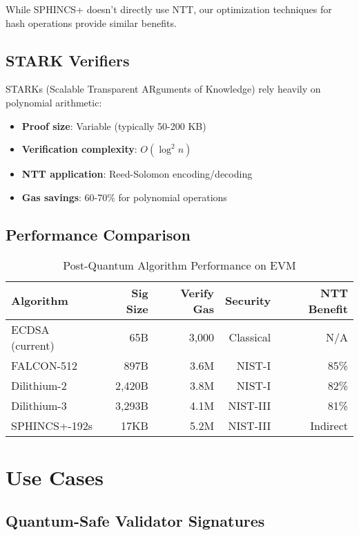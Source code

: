 \documentclass[11pt,a4paper]{article}
\begin{document}
While SPHINCS+ doesn't directly use NTT, our optimization techniques for hash operations provide similar benefits.

\subsection{STARK Verifiers}

STARKs (Scalable Transparent ARguments of Knowledge) rely heavily on polynomial arithmetic:

\begin{itemize}
\item \textbf{Proof size}: Variable (typically 50-200 KB)
\item \textbf{Verification complexity}: $O(\log^2 n)$
\item \textbf{NTT application}: Reed-Solomon encoding/decoding
\item \textbf{Gas savings}: 60-70\% for polynomial operations
\end{itemize}

\subsection{Performance Comparison}

\begin{table}[h]
\centering
\caption{Post-Quantum Algorithm Performance on EVM}
\begin{tabular}{lrrrr}
\toprule
Algorithm & Sig Size & Verify Gas & Security & NTT Benefit \\
\midrule
ECDSA (current) & 65B & 3,000 & Classical & N/A \\
FALCON-512 & 897B & 3.6M & NIST-I & 85\% \\
Dilithium-2 & 2,420B & 3.8M & NIST-I & 82\% \\
Dilithium-3 & 3,293B & 4.1M & NIST-III & 81\% \\
SPHINCS+-192s & 17KB & 5.2M & NIST-III & Indirect \\
\bottomrule
\end{tabular}
\end{table}

\section{Use Cases}

\subsection{Quantum-Safe Validator Signatures}
\end{document}
